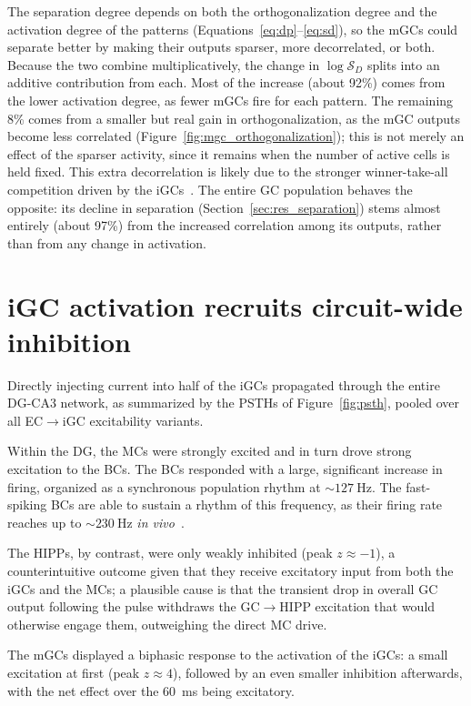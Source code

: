The separation degree depends on both the orthogonalization degree and the activation degree of the patterns
(Equations~\ref{eq:dp}--\ref{eq:sd}), so the mGCs could separate better by making their outputs sparser, more decorrelated, or
both. Because the two combine multiplicatively, the change in $\log \mathcal{S}_D$ splits into an additive contribution from each.
Most of the increase (about 92\%) comes from the lower activation degree, as fewer mGCs fire for each pattern. The remaining 8\%
comes from a smaller but real gain in orthogonalization, as the mGC outputs become less correlated
(Figure~\ref{fig:mgc_orthogonalization}); this is not merely an effect
of the sparser activity, since it remains when the number of active cells is held fixed. This extra
decorrelation is likely due to the stronger winner-take-all competition driven by the iGCs~\parencite{coultripCortical1992}. The
entire GC population behaves the opposite: its decline in separation (Section~\ref{sec:res_separation}) stems almost entirely
(about 97\%) from the increased correlation among its outputs, rather than from any change in activation.

\section{iGC activation recruits circuit-wide inhibition}\label{sec:res_activation}

Directly injecting current into half of the iGCs propagated through the entire DG-CA3 network, as summarized by the PSTHs of
Figure~\ref{fig:psth}, pooled over all EC$\to$iGC excitability variants.

Within the DG, the MCs were strongly excited and in turn drove strong excitation to the BCs. The BCs responded with a large,
significant increase in firing, organized as a synchronous population rhythm at $\sim\SI{127}{\hertz}$. The fast-spiking BCs are
able to sustain a rhythm of this frequency, as their firing rate reaches up to $\sim\SI{230}{\hertz}$ \textit{in
vivo}~\parencite{lubkeSpecialized1998}.

The HIPPs, by contrast, were only weakly inhibited (peak $z \approx -1$), a counterintuitive outcome given that they receive
excitatory input from both the iGCs and the MCs; a plausible cause is that the transient drop in overall GC output following the
pulse withdraws the GC$\to$HIPP excitation that would otherwise engage them, outweighing the direct MC drive.

The mGCs displayed a biphasic response to the activation of the iGCs: a small excitation at first (peak $z \approx 4$), followed
by an even smaller inhibition afterwards, with the net effect over the \SI{60}{\milli\second} being excitatory.

